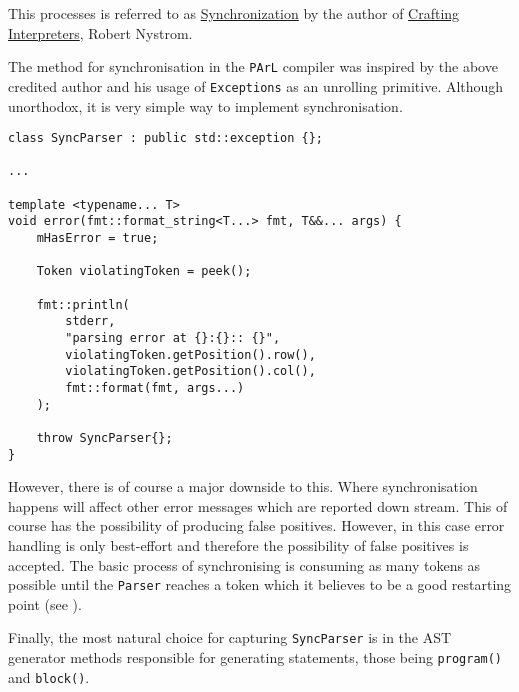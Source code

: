 \begin{attrib}
This processes is referred to as
\href{https://craftinginterpreters.com/parsing-expressions.html#synchronizing-a-recursive-descent-parser}{Synchronization}
by the author of
\href{https://craftinginterpreters.com/}{Crafting Interpreters},
\textcolor{UMRed}{Robert Nystrom}.
\end{attrib}

The method for synchronisation in the \texttt{PArL} compiler was
inspired by the above credited author and his usage of
\texttt{Exceptions} as an unrolling primitive. Although
unorthodox, it is very simple way to implement synchronisation.

\pagebreak

\begin{lstlisting}[caption={The \texttt{SyncParser} exception
and the \texttt{error()} method which kick-starts the
synchronisation process (parser/Parser.hpp).},
label=lst:synckickstart]
class SyncParser : public std::exception {};

...

template <typename... T>
void error(fmt::format_string<T...> fmt, T&&... args) {
    mHasError = true;

    Token violatingToken = peek();

    fmt::println(
        stderr,
        "parsing error at {}:{}:: {}",
        violatingToken.getPosition().row(),
        violatingToken.getPosition().col(),
        fmt::format(fmt, args...)
    );

    throw SyncParser{};
}
\end{lstlisting}

However, there is of course a major downside to this. Where
synchronisation happens will affect other error messages which
are reported down stream. This of course has the possibility of
producing false positives. However, in this case error handling
is only best-effort and therefore the possibility of false
positives is accepted. The basic process of synchronising is
consuming as many tokens as possible until the \texttt{Parser}
reaches a token which it believes to be a good restarting point
(see ).



Finally, the most natural choice for capturing
\texttt{SyncParser} is in the AST generator methods responsible
for generating statements, those being \texttt{program()} and
\texttt{block()}.

